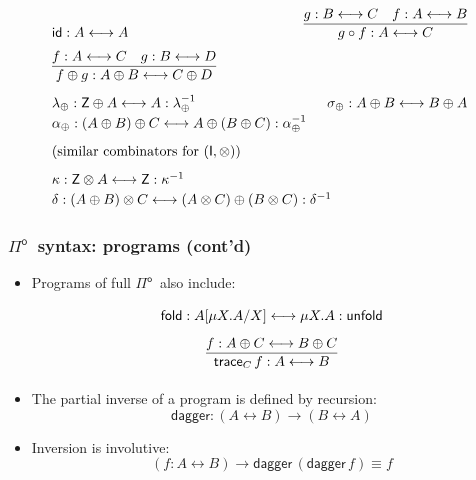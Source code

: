 \documentclass[12pt,t]{beamer}
\newcommand{\Pio}{\ensuremath{\mathsf{\Pi}^{\mathsf{o}}}}
\newcommand{\id}{\mathsf{id}}
\newcommand{\lr}{\longleftrightarrow}
\newcommand{\fold}{\mathsf{fold}}
\newcommand{\unfold}{\mathsf{unfold}}
\newcommand{\trace}{\ensuremath{\mathsf{trace}}}
\newcommand{\Z}{\mathsf{Z}}
\newcommand{\I}{\mathsf{I}}
\renewcommand{\dagger}{\mathsf{dagger}}
\begin{document}
\begin{frame}
\begin{itemize}
  \end{itemize}
  \small
  \[
  \arraycolsep=-10pt\def\arraystretch{1.2}
  \begin{array}{lr}%
    \id : A \lr A
    & \infer{g \circ f : A \lr C}{g : B \lr C & f : A \lr B} \\ [.2cm]
    \infer{f \oplus g : A \oplus B \lr C \oplus D}{f : A \lr C & g : B \lr D} 
    \\[.2cm] %
    \lambda_{\oplus} : \Z \oplus A \lr A : \lambda_{\oplus}^{-1}
    & \sigma_{\oplus} : A \oplus B \lr B \oplus A \\    
    \alpha_{\oplus} : (A \oplus B) \oplus C \lr A \oplus (B \oplus C) : \alpha_{\oplus}^{-1} \\[.2cm]
    (\text{similar combinators for $(\I,\otimes)$}) \\[.2cm]
    \kappa : \Z \otimes A \lr \Z : \kappa^{-1}  \\
     \delta : (A \oplus B) \otimes C \lr (A \otimes C) \oplus (B \otimes C) : \delta^{-1}
  \end{array}
  \]
\end{frame}
  
\begin{frame}

  \frametitle{\Pio\ syntax: programs (cont'd)}
  \begin{itemize}
  \item Programs of full \Pio\ also include:
    \[
    \def\arraystretch{1.6}  
    \begin{array}{c}
      \fold : A[\mu X.A/X] \lr \mu X.A : \unfold \\[.25cm]
      \infer{\trace_C \,f: A \lr B}{f : A \oplus C \lr B \oplus C}
    \end{array}
    \]
  \item The partial inverse of a program is defined by recursion:
    \[
    \dagger : (A \lr B) \to (B \lr A)
    \]
  \item Inversion is involutive:
    \[
    (f : A \lr B) \to \dagger \,(\dagger\,f) \equiv f
    \]
  \end{itemize}
\end{frame}
\end{document}
